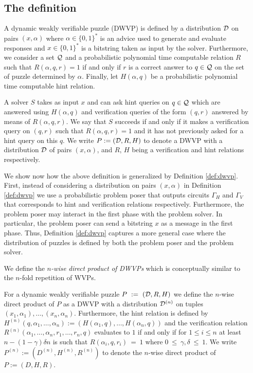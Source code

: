 \subsection{The definition}
\begin{definition}
  \label{def:dwvp_dodis}
  A \textnormal{dynamic weakly verifiable puzzle} (DWVP) is defined by a distribution $\mathcal{D}$ on pairs $(x, \alpha)$
  where $\alpha \in \{0,1\}^{*}$ is an advice used to generate and evaluate responses and $x \in \{0,1\}^{*}$ is
  a bitstring taken as input by the solver.
  Furthermore, we consider a set $\mathcal{Q}$ and a probabilistic polynomial time computable relation $R$ such that
  $R(\alpha, q, r) = 1$ if and only if $r$ is a correct answer to $q \in \mathcal{Q}$ on the set of puzzle determined by $\alpha$.
  Finally, let $H(\alpha, q)$ be a probabilistic polynomial time computable \textnormal{hint} relation.

  A solver $S$ takes as input $x$ and can ask hint queries on $q \in \mathcal{Q}$ which are answered using $H(\alpha, q)$ and verification
  queries of the form $(q,r)$ answered by means of $R(\alpha, q, r)$.
  We say that $S$ succeeds if and only if it makes a verification query on $(q,r)$ such that
  $R(\alpha,q,r) = 1$ and it
  has not previously asked for a hint query on this $q$. We write $P := (\mathcal{D}, R, H)$ to denote a DWVP with a distribution
  $\mathcal{D}$ of pairs $(x, \alpha)$, and $R$, $H$ being a verification and hint relations respectively.
\end{definition}
%
We show now how the above definition is generalized by Definition \ref{def:dwvp}.
First, instead of considering a distribution on pairs $(x,\alpha)$ in Definition \ref{def:dwvp}
we use a probabilistic problem poser that outputs circuits $\Gamma_H$ and $\Gamma_V$ that corresponds to hint
and verification relations respectively.
Furthermore, the problem poser may interact in the first phase with the problem solver.
In particular, the problem poser can send a bitstring $x$ as a message in the first phase.
Thus, Definition \ref{def:dwvp} captures a more general case where the distribution of
puzzles is defined by both the problem poser and the problem solver.

We define the \textit{$n$-wise direct product of DWVPs} which is conceptually similar to the $n$-fold repetition of WVPs.
%
\begin{definition}
For a dynamic weakly verifiable puzzle $P~:=~(\mathcal{D}, R, H)$ we define the $n$-wise direct product of $P$
as a DWVP with a distribution $\mathcal{D}^{(n)}$ on tuples $(x_1, \alpha_1), \dotsc, (x_n, \alpha_n)$.
Furthermore, the hint relation is defined by $H^{(n)}(q, \alpha_1, \dotsc, \alpha_n) := (H(\alpha_1, q), \dotsc, H(\alpha_n, q))$ and
the verification relation $R^{(n)}(\alpha_1, \dotsc, \alpha_n, r_1, \dotsc, r_n, q)$ evaluates to $1$ if and only if
for $1\!\leq\!i\!\leq\!n$ at least $n - (1 - \gamma)\delta n$ is such that $R(\alpha_i, q, r_i)~=~1$ where $0~\leq~\gamma,\delta~\leq~1$.
%
We write $P^{(n)} := (D^{(n)}, H^{(n)}, R^{(n)})$ to denote the $n$-wise direct product of $P := (D,H,R)$.
%
\end{definition}

